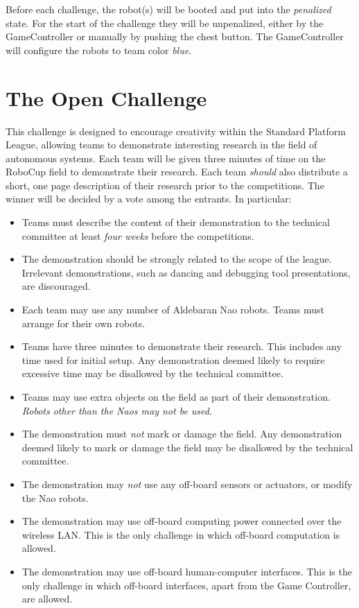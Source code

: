 \documentclass{article}
\begin{document}
Before each challenge, the robot(s) will be booted and put into the \emph{penalized} 
state. For the start of the challenge they will be unpenalized, either by the 
GameController or manually by pushing the chest button. The GameController will 
configure the robots to team color \emph{blue}.


\section{The Open Challenge}
\label{sec:open}
\newcommand{\openMinNum}{three}

This challenge is designed to encourage creativity within the Standard 
Platform League, allowing teams to demonstrate interesting research in 
the field of autonomous systems. Each team will be given \openMinNum{} 
minutes of time on the RoboCup field to demonstrate their research. 
Each team \emph{should} also distribute a short, one page description of 
their research prior to the competitions. The winner will be decided by 
a vote among the entrants. In particular:

\begin{itemize}
\item 
Teams must describe the content of their demonstration to the technical 
committee at least \emph{four weeks} before the competitions. 
\item 
The demonstration should be strongly related to the scope of the league. 
Irrelevant demonstrations, such as dancing and debugging tool presentations, 
are discouraged.
\item 
Each team may use any number of Aldebaran Nao robots. Teams must arrange
for their own robots.
\item 
Teams have \openMinNum{} minutes to demonstrate their research. This
includes any time used for initial setup. Any demonstration deemed
likely to require excessive time may be disallowed by the technical
committee.
\item 
Teams may use extra objects on the field as part of their
demonstration. \emph{Robots other than the Naos may not be used}.
\item 
The demonstration must \emph{not} mark or damage the field. Any
demonstration deemed likely to mark or damage the field may be
disallowed by the technical committee.
\item 
The demonstration may \emph{not} use any off-board sensors or
actuators, or modify the Nao robots.
\item 
The demonstration may use off-board computing power connected over the
wireless LAN. This is the only challenge in which off-board
computation is allowed.
\item 
The demonstration may use off-board human-computer interfaces. This
is the only challenge in which off-board interfaces, apart from the
Game Controller, are allowed.
\end{itemize}
\end{document}

